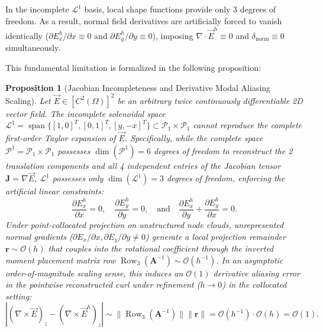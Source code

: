 \documentclass[preprint,12pt]{elsarticle}
\newtheorem{proposition}{Proposition}
\begin{document}
In the incomplete $\mathcal{L}^1$ basis, local shape functions provide only 3 degrees of freedom. As a result, normal field derivatives are artificially forced to vanish identically ($\partial E_x^h/\partial x \equiv 0$ and $\partial E_y^h/\partial y \equiv 0$), imposing $\nabla \cdot \vec{E}^h \equiv 0$ and $\delta_{\mathrm{norm}} \equiv 0$ simultaneously.

This fundamental limitation is formalized in the following proposition:

\begin{proposition}[Jacobian Incompleteness and Derivative Modal Aliasing Scaling]
\label{prop:L1_aliasing}
Let $\vec{E} \in [C^2(\Omega)]^2$ be an arbitrary twice continuously differentiable 2D vector field. The incomplete solenoidal space $\mathcal{L}^1 = \operatorname{span}\{[1, 0]^T, [0, 1]^T, [y, -x]^T\} \subset \mathcal{P}_1 \times \mathcal{P}_1$ cannot reproduce the complete first-order Taylor expansion of $\vec{E}$. Specifically, while the complete space $\mathcal{P}^1 = \mathcal{P}_1 \times \mathcal{P}_1$ possesses $\dim(\mathcal{P}^1) = 6$ degrees of freedom to reconstruct the 2 translation components and all 4 independent entries of the Jacobian tensor $\mathbf{J} = \nabla\vec{E}$, $\mathcal{L}^1$ possesses only $\dim(\mathcal{L}^1) = 3$ degrees of freedom, enforcing the artificial linear constraints:
\begin{equation}
\frac{\partial E_x^h}{\partial x} = 0, \quad \frac{\partial E_y^h}{\partial y} = 0, \quad \text{and} \quad \frac{\partial E_x^h}{\partial y} + \frac{\partial E_y^h}{\partial x} = 0.
\label{eq:L1_derivative_constraints}
\end{equation}
Under point-collocated projection on unstructured node clouds, unrepresented normal gradients ($\partial E_x/\partial x, \partial E_y/\partial y \neq 0$) generate a local projection remainder $\mathbf{r} \sim \mathcal{O}(h)$ that couples into the rotational coefficient through the inverted moment placement matrix row $\operatorname{Row}_3(\mathbf{A}^{-1}) \sim \mathcal{O}(h^{-1})$. In an asymptotic order-of-magnitude scaling sense, this induces an $\mathcal{O}(1)$ derivative aliasing error in the pointwise reconstructed curl under refinement ($h \to 0$) in the collocated setting:
\begin{equation}
|(\nabla \times \vec{E})_z - (\nabla \times \vec{E}^h)_z| \sim \|\operatorname{Row}_3(\mathbf{A}^{-1})\| \|\mathbf{r}\| = \mathcal{O}(h^{-1}) \cdot \mathcal{O}(h) = \mathcal{O}(1).
\label{eq:aliasing_order_proof}
\end{equation}
\end{proposition}
\end{document}
